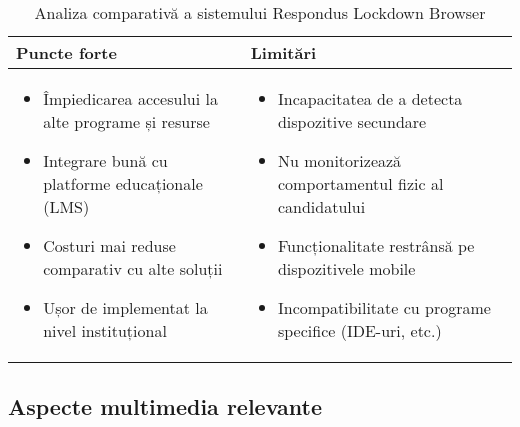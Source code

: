 \documentclass[12pt,a4paper]{article}
\begin{document}
\begin{table}[H] %
    \centering
    \begin{tabular}{|p{7.5cm}|p{7.5cm}|}
    \hline
    \textbf{Puncte forte} & \textbf{Limitări} \\
    \hline
    \begin{itemize}
        \item Împiedicarea accesului la alte programe și resurse
        \item Integrare bună cu platforme educaționale (LMS)
        \item Costuri mai reduse comparativ cu alte soluții
        \item Ușor de implementat la nivel instituțional
    \end{itemize} & 
    \begin{itemize}
        \item Incapacitatea de a detecta dispozitive secundare
        \item Nu monitorizează comportamentul fizic al candidatului
        \item Funcționalitate restrânsă pe dispozitivele mobile
        \item Incompatibilitate cu programe specifice (IDE-uri, etc.)
    \end{itemize} \\
    \hline
    \end{tabular}
    \caption{Analiza comparativă a sistemului Respondus Lockdown Browser}
\end{table}

\subsection{Aspecte multimedia relevante}
\end{document}
